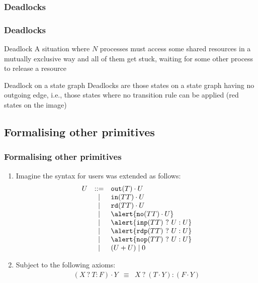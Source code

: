 \documentclass[handout]{beamer}\mode<presentation>{\usetheme{AMSCesenaBleu}}
\begin{document}
\subsubsection{Deadlocks}

\begin{frame}
\frametitle{Deadlocks}
    \begin{block}{Deadlock}
        A situation where $N$ processes must access some shared resources in a mutually exclusive way and all of them get stuck, waiting for some other process to release a resource
    \end{block}
    
    \pause\vfill
    
    \vfill
    
    \begin{alertblock}{Deadlock on a state graph}
        Deadlocks are those states on a state graph having \alert{no outgoing edge}, i.e., those states where \alert{no transition rule} can be applied (red states on the image)
    \end{alertblock}

\end{frame}

\subsection{Formalising other primitives}

\begin{frame}
\frametitle{Formalising other primitives}
    
    \begin{enumerate}
        \item<1-> Imagine the syntax for users was extended as follows:
        \[\begin{array}{rcl}
            U &::=& \mathtt{out}(T) \cdot U \\
            &\mid& \mathtt{in}(TT) \cdot U \\
            &\mid& \mathtt{rd}(TT) \cdot U \\
            &\mid& \alert{\mathtt{no}(TT) \cdot U} \\
            &\mid& \alert{\mathtt{inp}(TT)\ ?\ U : U} \\
            &\mid& \alert{\mathtt{rdp}(TT)\ ?\ U : U} \\
            &\mid& \alert{\mathtt{nop}(TT)\ ?\ U : U} \\
            &\mid& (U + U) \mid 0
        \end{array}\]
        
        \item<2> Subject to the following axioms:
        \[\begin{array}{rcl}
            (X\ ?\ T : F) \cdot Y &\equiv& X\ ?\ (T \cdot Y) : (F \cdot Y)
        \end{array}\]
        
    \end{enumerate}
    
\end{frame}
\end{document}
